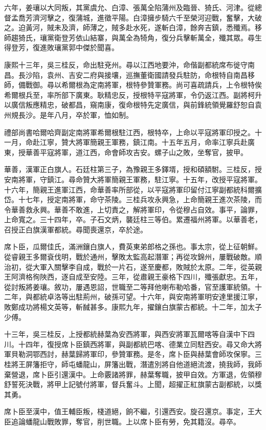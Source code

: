\begin{pinyinscope}
六年，姜瓖以大同叛，其黨虞允、白漳、張萬全陷蒲州及臨晉、猗氏、河津。從總督孟喬芳濟河擊之，復蒲城，進徵平陽。白漳擁步騎六千至榮河迎戰，奮擊，大破之。迫黃河，賊未及濟，師薄之，賊多赴水死，遂斬白漳，餘奔吉鎮，悉殲焉。移師趨猗氏，瓖黨衛登芳依山結寨，與萬全為犄角，復分兵擊斬萬全，殲其眾。尋生得登芳，復進敗瓖黨郭中傑於聞喜。

康熙十三年，吳三桂反，命出駐兗州。尋以江西地要沖，命偕副都統席布徙守南昌。長沙陷，袁州、吉安二府與接壤，巡撫董衛國請發兵駐防，命根特自南昌移師，備戰御。尋以希爾根為定南將軍，根特參贊軍務。尚可喜疏請兵，上令根特俟希爾根兵至，率所部下廣東。耿精忠反，授根特平寇將軍，令仍返江西。副將柯升以廣信叛應精忠，破都昌，窺南康，復命根特先定廣信，與前鋒統領覺羅舒恕自袁州規長沙。是年八月，卒於軍，恤如制。

禮部尚書哈爾哈齊副定南將軍希爾根駐江西，根特卒，上命以平寇將軍印授之。十一月，命赴江寧，贊大將軍簡親王軍務，鎮江南。十五年五月，命率江寧兵赴廣東，授華善平寇將軍，道江西，命會師攻吉安。螺子山之敗，坐奪官，披甲。

華善，漢軍正白旗人。石廷柱第三子，為豫親王多鐸壻，授和碩額駙。三桂反，授安南將軍，守鎮江。尋命贊大將軍簡親王軍務，駐江寧。十五年，改授平寇將軍。十六年，簡親王進軍江西，命華善率所部從，以平寇將軍印留付江寧副都統科爾擴岱。十七年，授定南將軍，命守茶陵。三桂兵攻永興急，上命簡親王進次茶陵，而令華善救永興。華善不敢進，上切責之，解將軍印，令從穆占自效。事平，論罪，上命寬之。三十四年，卒。子石文炳，襲廷柱三等伯。累遷福州將軍。以華善老，召授正白旗漢軍都統。尋聞喪還京，卒於途。

席卜臣，瓜爾佳氏，滿洲鑲白旗人，費英東弟郎格之孫也。事太宗，從上征朝鮮。從睿親王多爾袞伐明，戰於通州，擊敗太監高起潛軍；再從攻錦州，屢戰破敵。順治初，從大軍入關擊李自成，戰於一片石，遂至慶都，敗賊於太原。二年，從英親王阿濟格徇陜西，逐自成至安陸。三年，從肅親王豪格下四川，殲張獻忠。五年，從討叛將姜瓖。敘功，屢遇恩詔，世職至二等拜他喇布勒哈番，官至護軍統領。十二年，與都統卓洛等出駐荊州，破孫可望。十六年，與安南將軍明安達里援江寧，敗鄭成功將楊文英等，斬馘甚多。康熙九年，擢鑲白旗蒙古都統。十二年，加太子少傅。

十三年，吳三桂反，上授都統赫葉為安西將軍，與西安將軍瓦爾喀等自漢中下四川。十四年，復授席卜臣鎮西將軍，與副都統巴喀、德業立同駐西安。尋又命大將軍貝勒洞鄂西討，赫葉歸將軍印，參贊軍務。是冬，席卜臣與赫葉會師攻保寧。三桂將王屏籓拒守，師屯蟠龍山，屏籓出戰，潛遣別將自他道絕流渡，撓我師，我師棄營退，席卜臣引還漢中。上命覈諸將罪，赫葉奪職，披甲自效。方軍退，佐領穆舒誓死決戰，將甲上記號付將軍，督兵奮斗。上聞，超擢正紅旗蒙古副都統，以獎其勇。

席卜臣至漢中，值王輔臣叛，棧道絕，餉不繼，引還西安。旋召還京。事定，王大臣追論蟠龍山戰敗罪，奪官，削世職。上以席卜臣有勞，免其籍沒。尋卒。


\end{pinyinscope}
